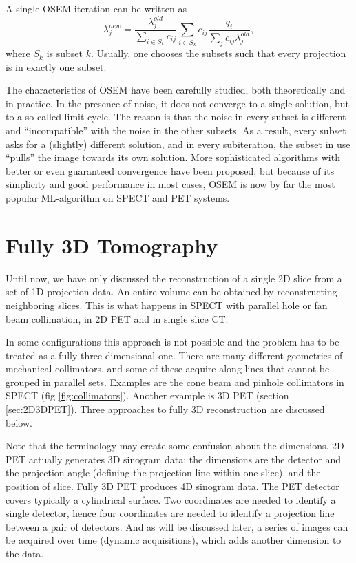 A single OSEM iteration can be written as
\begin{equation}
  \lambda_j^{new}  =  \frac{\lambda_j^{old}}{\sum_{i\in S_k} c_{ij}}
           \sum_{i\in S_k} c_{ij}  \frac{q_i}{\sum_j c_{ij} \lambda_j^{old}},
           \label{eq:osem}
\end{equation}
where $S_k$ is subset $k$. Usually, one chooses the subsets such that
every projection is in exactly one subset.

The characteristics of OSEM have been carefully studied, both
theoretically and in practice. In the presence of noise, it does not
converge to a single solution, but to a so-called limit cycle. The
reason is that the noise in every subset is different and
``incompatible'' with the noise in the other subsets. As a result,
every subset asks for a (slightly) different solution, and in every
subiteration, the subset in use ``pulls'' the image towards its own
solution. More sophisticated algorithms with better or even guaranteed
convergence have been proposed, but because of its simplicity and good
performance in most cases, OSEM is now by far the most popular
ML-algorithm on SPECT and PET systems.



\section{Fully 3D Tomography}
Until now, we have only discussed the reconstruction of a single 2D slice from
a set of 1D projection data. An entire volume can be obtained by
reconstructing neighboring slices.  This is what happens in SPECT with
parallel hole or fan beam collimation, in 2D PET and in single slice CT.

In some configurations this approach is not possible and the problem
has to be treated as a fully three-dimensional one. There are many
different geometries of mechanical collimators, and some of these
acquire along lines that cannot be grouped in parallel sets. Examples
are the cone beam and pinhole collimators in SPECT (fig
\ref{fig:collimators}). Another example is 3D PET (section
\ref{sec:2D3DPET}). Three approaches to fully 3D reconstruction are
discussed below.

Note that the terminology may create some confusion about the
dimensions. 2D PET actually generates 3D sinogram data: the dimensions
are the detector and the projection angle (defining the projection
line within one slice), and the position of slice. Fully 3D PET
produces 4D sinogram data. The PET detector covers typically a
cylindrical surface. Two coordinates are needed to identify a single
detector, hence four coordinates are needed to identify a projection
line between a pair of detectors. And as will be discussed later, a series
of images can be acquired over time (dynamic acquisitions), which adds
another dimension to the data.


